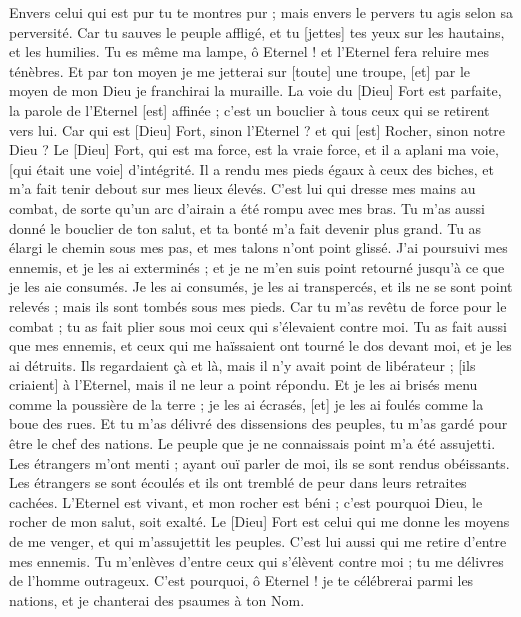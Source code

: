 \begin{multicols}{2}
Envers celui qui est pur tu te montres pur ; mais envers le pervers tu agis selon sa perversité.
Car tu sauves le peuple affligé, et tu [jettes] tes yeux sur les hautains, et les humilies.
Tu es même ma lampe, ô Eternel ! et l'Eternel fera reluire mes ténèbres.
Et par ton moyen je me jetterai sur [toute] une troupe, [et] par le moyen de mon Dieu je franchirai la muraille.
La voie du [Dieu] Fort est parfaite, la parole de l'Eternel [est] affinée ; c'est un bouclier à tous ceux qui se retirent vers lui.
Car qui est [Dieu] Fort, sinon l'Eternel ? et qui [est] Rocher, sinon notre Dieu ?
Le [Dieu] Fort, qui est ma force, est la vraie force, et il a aplani ma voie, [qui était une voie] d'intégrité.
Il a rendu mes pieds égaux à ceux des biches, et m'a fait tenir debout sur mes lieux élevés.
C'est lui qui dresse mes mains au combat, de sorte qu'un arc d'airain a été rompu avec mes bras.
Tu m'as aussi donné le bouclier de ton salut, et ta bonté m'a fait devenir plus grand.
Tu as élargi le chemin sous mes pas, et mes talons n'ont point glissé.
J'ai poursuivi mes ennemis, et je les ai exterminés ; et je ne m'en suis point retourné jusqu'à ce que je les aie consumés.
Je les ai consumés, je les ai transpercés, et ils ne se sont point relevés ; mais ils sont tombés sous mes pieds.
Car tu m'as revêtu de force pour le combat ; tu as fait plier sous moi ceux qui s'élevaient contre moi.
Tu as fait aussi que mes ennemis, et ceux qui me haïssaient ont tourné le dos devant moi, et je les ai détruits.
Ils regardaient çà et là, mais il n'y avait point de libérateur ; [ils criaient] à l'Eternel, mais il ne leur a point répondu.
Et je les ai brisés menu comme la poussière de la terre ; je les ai écrasés, [et] je les ai foulés comme la boue des rues.
Et tu m'as délivré des dissensions des peuples, tu m'as gardé pour être le chef des nations. Le peuple que je ne connaissais point m'a été assujetti.
Les étrangers m'ont menti ; ayant ouï parler de moi, ils se sont rendus obéissants.
Les étrangers se sont écoulés et ils ont tremblé de peur dans leurs retraites cachées.
L'Eternel est vivant, et mon rocher est béni ; c'est pourquoi Dieu, le rocher de mon salut, soit exalté.
Le [Dieu] Fort est celui qui me donne les moyens de me venger, et qui m'assujettit les peuples.
C'est lui aussi qui me retire d'entre mes ennemis. Tu m'enlèves d'entre ceux qui s'élèvent contre moi ; tu me délivres de l'homme outrageux.
C'est pourquoi, ô Eternel ! je te célébrerai parmi les nations, et je chanterai des psaumes à ton Nom.

\end{multicols}
